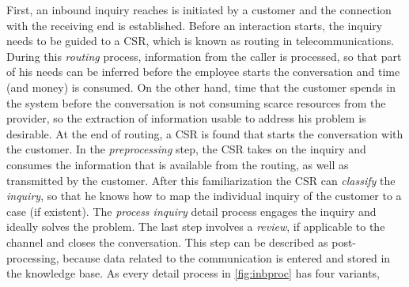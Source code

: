 First, an inbound inquiry reaches is initiated by a customer and the connection with the receiving end is established. Before an interaction starts, the inquiry needs to be guided to a \acrshort{CSR}, which is known as routing in telecommunications. During this \textit{routing} process, information from the caller is processed, so that part of his needs can be inferred before the employee starts the conversation and time (and money) is consumed. On the other hand, time that the customer spends in the system before the conversation is not consuming scarce resources from the provider, so the extraction of information usable to address his problem is desirable. At the end of routing, a \acrshort{CSR} is found that starts the conversation with the customer. In the \textit{preprocessing} step, the \acrshort{CSR} takes on the inquiry and consumes the information that is available from the routing, as well as transmitted by the customer. After this familiarization the \acrshort{CSR} can \textit{classify} the \textit{inquiry}, so that he knows how to map the individual inquiry of the customer to a case (if existent). The\textit{ process inquiry } detail process engages the inquiry and ideally solves the problem. The last step involves a \textit{review}, if applicable to the channel and closes the conversation. This step can be described as post-processing, because data related to the communication is entered and stored in the knowledge base. As every detail process in \Fig \ref{fig:inbproc} has four variants, 
	


